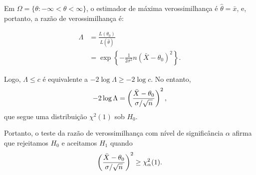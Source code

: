 \documentclass[12pt]{beamer}
\begin{document}
\begin{frame}{}
	\begin{block}{}
		\justifying
		Em $\Omega = \{\theta : -\infty < \theta < \infty\}$, o estimador de máxima verossimilhança é $\hat{\theta} = \bar{x}$, e, portanto, a razão de verossimilhança é:
		
		\[
		\begin{aligned}
			\Lambda &= \frac{L(\theta_0)}{L(\hat{\theta})} \\
			&= \exp\left\{ -\frac{1}{2\sigma^2}n(\bar{X} - \theta_0)^2 \right\}.
		\end{aligned}
		\]
	\end{block}
	\pause
	\begin{block}{}
		\justifying
		Logo, $\Lambda \leq c$ é equivalente a $-2 \log \Lambda \geq -2 \log c$. No entanto, 
		\[
		-2 \log \Lambda = \left(\frac{\Bar{X} - \theta_0}{\sigma/\sqrt{n}}\right)^{2},
		\]
		que segue uma distribuição $\chi^2(1)$ sob $H_0$. 
	\end{block}
\end{frame}


\begin{frame}{}
	\begin{block}{}
		\justifying
		Portanto, o teste da razão de verossimilhança com nível de significância $\alpha$ afirma que rejeitamos $H_0$ e aceitamos $H_1$ quando
		\[
		\left(\frac{\Bar{X} - \theta_0}{\sigma/\sqrt{n}}\right)^{2} \geq \chi^2_\alpha(1).
		\]
		
	\end{block}
\end{frame}
\end{document}
